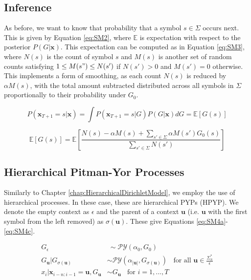 
\subsection{Inference}

As before, we want to know that probability that a symbol $s\in\Sigma$ occurs next. This is given by Equation \ref{eq:SM2}, where $\mathbb{E}$ is expectation with respect to the posterior $P(G|\boldsymbol{x})$. This expectation can be computed as in Equation \ref{eq:SM3}, where $N(s)$ is the count of symbol $s$ and $M(s)$ is another set of random counts satisfying $1\leq M(s")\leq N(s')$ if $N(s')>0$ and $M(s')=0$ otherwise. This implements a form of smoothing, as each count $N(s)$ is reduced by $\alpha M(s)$, with the total amount subtracted distributed across all symbols in $\Sigma$ proportionally to their probability under $G_{0}$.

\begin{equation}
P(\boldsymbol{x}_{T+1}=s|\boldsymbol{x})=\int P(\boldsymbol{x}_{T+1}=s|G)P(G|\boldsymbol{x})dG=\mathbb{E}[G(s)]
\label{eq:SM2}
\end{equation}

\begin{equation}
\mathbb{E}[G(s)]=\mathbb{E}\left[\frac{N(s)-\alpha M(s)+\sum_{s'\in\Sigma}\alpha M(s')G_{0}(s)}{\sum_{s'\in\Sigma}N(s')}\right]
\label{eq:SM3}
\end{equation}

\subsection{Hierarchical Pitman-Yor Processes}
Similarly to Chapter \ref{chap:HierarchicalDirichletModel}, we employ the use of hierarchical processes. In these case, these are hierarchical PYPs (HPYP). We denote the empty context as $\epsilon$ and the parent of a context $\boldsymbol{u}$ (i.e. $\boldsymbol{u}$ with the first symbol from the left removed) as $\sigma(\boldsymbol{u})$. These give Equations \ref{eq:SM4a}-\ref{eq:SM4c}.

\begin{subequations}
\label{eq:SM4}
\begin{align}
G_{\epsilon}&~\sim\mathcal{PY}(\alpha_{0},G_{0}) \label{eq:SM4a}
\\
G_{\boldsymbol{u}}|G_{\sigma(\boldsymbol{u})}&\sim\mathcal{PY}(\alpha_{|\boldsymbol{u}|},G_{\sigma(\boldsymbol{u})})\ \ \ \ \text{for all }\boldsymbol{u}\in\frac{\Sigma_{n}^{*}}{\epsilon} \label{eq:SM4b}
\\
x_{i}|\boldsymbol{x}_{i-n:i-1}=\boldsymbol{u},G_{\boldsymbol{u}}&\sim G_{\boldsymbol{u}}\ \ \ \ \text{for }i=1,...,T \label{eq:SM4c}
\end{align}
\end{subequations}

